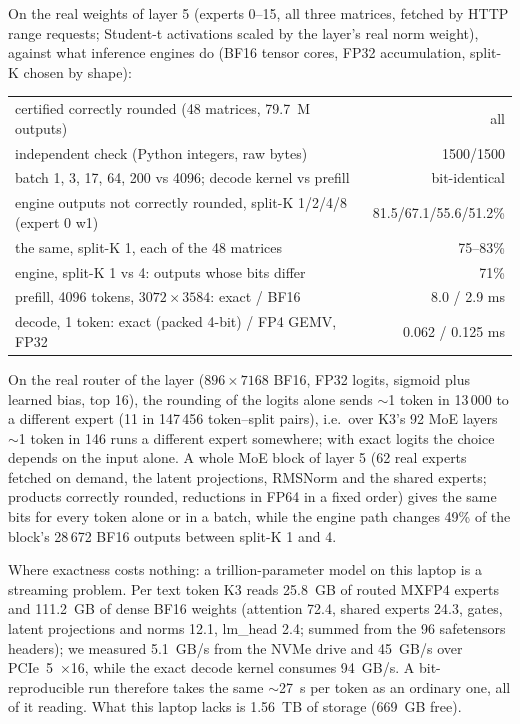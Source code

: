 \documentclass[11pt]{article}
\begin{document}
On the real weights of layer 5 (experts 0--15, all three matrices, fetched by HTTP range requests; Student-t activations
scaled by the layer's real norm weight), against what inference engines do (BF16 tensor cores, FP32 accumulation, split-K
chosen by shape):
\begin{center}\begin{tabular}{lr}\toprule
certified correctly rounded (48 matrices, 79.7~M outputs) & all \\
independent check (Python integers, raw bytes) & 1500/1500 \\
batch 1, 3, 17, 64, 200 vs 4096; decode kernel vs prefill & bit-identical \\
engine outputs not correctly rounded, split-K 1/2/4/8 (expert 0 w1) & 81.5/67.1/55.6/51.2\% \\
the same, split-K 1, each of the 48 matrices & 75--83\% \\
engine, split-K 1 vs 4: outputs whose bits differ & 71\% \\
prefill, 4096 tokens, $3072\times3584$: exact / BF16 & 8.0 / 2.9 ms \\
decode, 1 token: exact (packed 4-bit) / FP4 GEMV, FP32 & 0.062 / 0.125 ms \\\bottomrule
\end{tabular}\end{center}
On the real router of the layer ($896\times7168$ BF16, FP32 logits, sigmoid plus learned bias, top 16), the rounding of the
logits alone sends $\sim$1 token in 13\,000 to a different expert (11 in 147\,456 token--split pairs), i.e.\ over K3's 92 MoE
layers $\sim$1 token in 146 runs a different expert somewhere; with exact logits the choice depends on the input alone.
A whole MoE block of layer 5 (62 real experts fetched on demand, the latent projections, RMSNorm and the shared experts;
products correctly rounded, reductions in FP64 in a fixed order) gives the same bits for every token alone or in a batch,
while the engine path changes 49\% of the block's 28\,672 BF16 outputs between split-K 1 and 4.

Where exactness costs nothing: a trillion-parameter model on this laptop is a streaming problem. Per text token K3 reads 25.8~GB
of routed MXFP4 experts and 111.2~GB of dense BF16 weights (attention 72.4, shared experts 24.3, gates, latent projections and norms 12.1, lm\_head 2.4; summed from the 96 safetensors headers); we measured 5.1~GB/s from the NVMe drive and 45~GB/s over
PCIe~5~$\times$16, while the exact decode kernel consumes 94~GB/s. A bit-reproducible run therefore takes the same
$\sim$27~s per token as an ordinary one, all of it reading. What this laptop lacks is 1.56~TB of storage (669~GB free).
\end{document}
